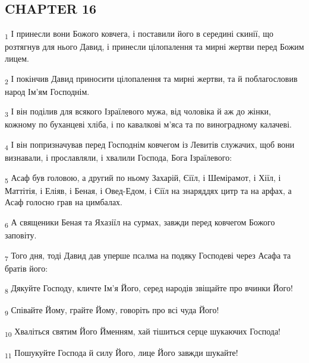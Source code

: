 \subsection{CHAPTER 16}
\begin{tcolorbox}
\textsubscript{1} І принесли вони Божого ковчега, і поставили його в середині скинії, що розтягнув для нього Давид, і принесли цілопалення та мирні жертви перед Божим лицем.
\end{tcolorbox}
\begin{tcolorbox}
\textsubscript{2} І покінчив Давид приносити цілопалення та мирні жертви, та й поблагословив народ Ім'ям Господнім.
\end{tcolorbox}
\begin{tcolorbox}
\textsubscript{3} І він поділив для всякого Ізраїлевого мужа, від чоловіка й аж до жінки, кожному по буханцеві хліба, і по кавалкові м'яса та по виноградному калачеві.
\end{tcolorbox}
\begin{tcolorbox}
\textsubscript{4} І він попризначував перед Господнім ковчегом із Левитів служачих, щоб вони визнавали, і прославляли, і хвалили Господа, Бога Ізраїлевого:
\end{tcolorbox}
\begin{tcolorbox}
\textsubscript{5} Асаф був головою, а другий по ньому Захарій, Єіїл, і Шемірамот, і Хіїл, і Маттітія, і Еліяв, і Беная, і Овед-Едом, і Єіїл на знаряддях цитр та на арфах, а Асаф голосно грав на цимбалах.
\end{tcolorbox}
\begin{tcolorbox}
\textsubscript{6} А священики Беная та Яхазіїл на сурмах, завжди перед ковчегом Божого заповіту.
\end{tcolorbox}
\begin{tcolorbox}
\textsubscript{7} Того дня, тоді Давид дав уперше псалма на подяку Господеві через Асафа та братів його:
\end{tcolorbox}
\begin{tcolorbox}
\textsubscript{8} Дякуйте Господу, кличте Ім'я Його, серед народів звіщайте про вчинки Його!
\end{tcolorbox}
\begin{tcolorbox}
\textsubscript{9} Співайте Йому, грайте Йому, говоріть про всі чуда Його!
\end{tcolorbox}
\begin{tcolorbox}
\textsubscript{10} Хваліться святим Його Йменням, хай тішиться серце шукаючих Господа!
\end{tcolorbox}
\begin{tcolorbox}
\textsubscript{11} Пошукуйте Господа й силу Його, лице Його завжди шукайте!
\end{tcolorbox}
